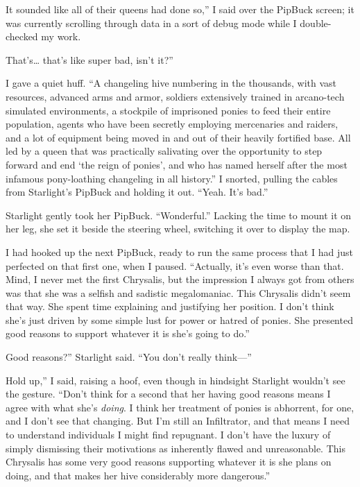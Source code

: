\leavevmode{}It sounded like all of their queens had done so,” I said over the PipBuck screen; it was currently scrolling through data in a sort of debug mode while I double-checked my work.

\leavevmode{}That’s… that’s like super bad, isn’t it?”

I gave a quiet huff. “A changeling hive numbering in the thousands, with vast resources, advanced arms and armor, soldiers extensively trained in arcano-tech simulated environments, a stockpile of imprisoned ponies to feed their entire population, agents who have been secretly employing mercenaries and raiders, and a lot of equipment being moved in and out of their heavily fortified base. All led by a queen that was practically salivating over the opportunity to step forward and end ‘the reign of ponies’, and who has named herself after the most infamous pony-loathing changeling in all history.” I snorted, pulling the cables from Starlight’s PipBuck and holding it out. “Yeah. It’s bad.”

Starlight gently took her PipBuck. “Wonderful.” Lacking the time to mount it on her leg, she set it beside the steering wheel, switching it over to display the map.

I had hooked up the next PipBuck, ready to run the same process that I had just perfected on that first one, when I paused. “Actually, it’s even worse than that. Mind, I never met the first Chrysalis, but the impression I always got from others was that she was a selfish and sadistic megalomaniac. This Chrysalis didn’t seem that way. She spent time explaining and justifying her position. I don’t think she’s just driven by some simple lust for power or hatred of ponies. She presented good reasons to support whatever it is she’s going to do.”

\leavevmode{}Good reasons?” Starlight said. “You don’t really think—”

\leavevmode{}Hold up,” I said, raising a hoof, even though in hindsight Starlight wouldn’t see the gesture. “Don’t think for a second that her having good reasons means I agree with what she’s \textit{doing}. I think her treatment of ponies is abhorrent, for one, and I don’t see that changing. But I’m still an Infiltrator, and that means I need to understand individuals I might find repugnant. I don’t have the luxury of simply dismissing their motivations as inherently flawed and unreasonable. This Chrysalis has some very good reasons supporting whatever it is she plans on doing, and that makes her hive considerably more dangerous.”

